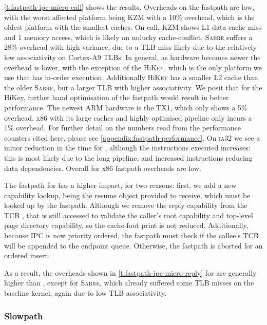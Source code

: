 \cref{t:fastpath-ipc-micro-call} shows the results.
Overheads on the \call fastpath are low, with the worst affected platform being
\textsc{KZM} with a 10\% overhead, which is the oldest platform with the smallest caches. On call,
\textsc{KZM} shows L1 data cache miss and 1 memory access, which is likely an unlucky
cache-conflict. \textsc{Sabre} suffers a 28\% overhead with high variance, due to a \gls{TLB} miss likely
due to the relatively low associativity on Cortex-A9 \glspl{TLB}.  In general, as hardware becomes newer the
overhead is lower, with the exception of the \textsc{HiKey}, which is the only platform we use that has 
in-order execution. Additionally \textsc{HiKey} has a smaller L2 cache than the older \textsc{Sabre},
but a larger \gls{TLB} with higher associativity.
We posit that for the HiKey, further hand optimisation of the fastpath would result in better
performance. The newest ARM hardware is the TX1, which only shows a 5\% overhead. x86 with its large
caches and highly optimised pipeline only incurs a 1\% overhead. For further detail on the
numbers read from the performance counters cited here, please see
\cref{appendix:fastpath-performance}. On \textsc{ia32} we see a minor reduction in the time for
\call, although the instructions executed increases: this is most likely due to the long pipeline,
and increased instructions reducing data dependencies. Overall for x86 fastpath overheads are low. 

The fastpath for \replyrecv has a higher impact, for two reasons: first, we add a new capability
lookup, being the resume object provided to receive, which must be looked up by the \replyrecv
fastpath. Although we remove the reply capability from the \gls{TCB}
\cnode, that \cnode is still accessed to validate the caller's root \cnode capability
and top-level page directory capability, so the cache-foot print is not reduced. Additionally, because
\gls{IPC} is now priority ordered, the fastpath must check if the callee's \gls{TCB} will be appended to the
endpoint queue. Otherwise, the fastpath is aborted for an ordered insert. 

As a result, the overheads shown in \cref{t:fastpath-ipc-micro-reply} for \replyrecv are generally higher
than \call, except for \textsc{Sabre}, which already suffered some \gls{TLB} misses on
the baseline kernel, again due to low \gls{TLB} associativity.
\clearpage

\subsubsection{Slowpath}
\label{eval:slowpath}

